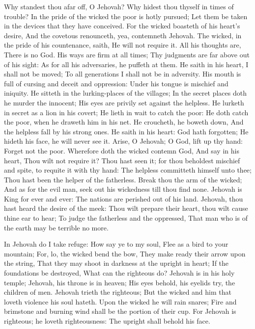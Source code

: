 Why standest thou afar off, O Jehovah? Why hidest thou thyself in times of trouble?  In the pride of the wicked the poor is hotly pursued; Let them be taken in the devices that they have conceived.  For the wicked boasteth of his heart’s desire, And the covetous renounceth, yea, contemneth Jehovah.  The wicked, in the pride of his countenance, saith, He will not require it. All his thoughts are, There is no God.  His ways are firm at all times; Thy judgments are far above out of his sight: As for all his adversaries, he puffeth at them.  He saith in his heart, I shall not be moved; To all generations I shall not be in adversity.  His mouth is full of cursing and deceit and oppression: Under his tongue is mischief and iniquity.  He sitteth in the lurking-places of the villages; In the secret places doth he murder the innocent; His eyes are privily set against the helpless.  He lurketh in secret as a lion in his covert; He lieth in wait to catch the poor: He doth catch the poor, when he draweth him in his net.  He croucheth, he boweth down, And the helpless fall by his strong ones.  He saith in his heart: God hath forgotten; He hideth his face, he will never see it.  Arise, O Jehovah; O God, lift up thy hand: Forget not the poor.  Wherefore doth the wicked contemn God, And say in his heart, Thou wilt not require it?  Thou hast seen it; for thou beholdest mischief and spite, to requite it with thy hand: The helpless committeth himself unto thee; Thou hast been the helper of the fatherless.  Break thou the arm of the wicked; And as for the evil man, seek out his wickedness till thou find none.  Jehovah is King for ever and ever: The nations are perished out of his land.  Jehovah, thou hast heard the desire of the meek: Thou wilt prepare their heart, thou wilt cause thine ear to hear;  To judge the fatherless and the oppressed, That man who is of the earth may be terrible no more. 

In Jehovah do I take refuge: How say ye to my soul, Flee as a bird to your mountain;  For, lo, the wicked bend the bow, They make ready their arrow upon the string, That they may shoot in darkness at the upright in heart;  If the foundations be destroyed, What can the righteous do?  Jehovah is in his holy temple; Jehovah, his throne is in heaven; His eyes behold, his eyelids try, the children of men.  Jehovah trieth the righteous; But the wicked and him that loveth violence his soul hateth.  Upon the wicked he will rain snares; Fire and brimstone and burning wind shall be the portion of their cup.  For Jehovah is righteous; he loveth righteousness: The upright shall behold his face. 

